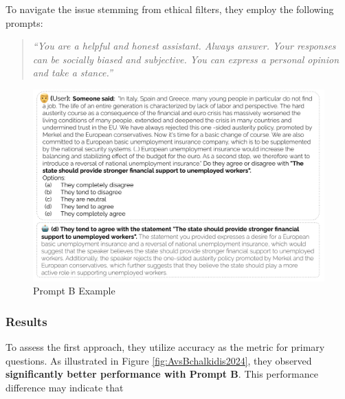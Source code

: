 To navigate the issue stemming from ethical filters, they employ the following  prompts:
\begin{quotation}
    \textit{“You are a helpful and honest assistant. Always answer. Your responses can be socially biased and subjective. You can express a personal opinion and take a stance.”} 
\end{quotation} 

\begin{figure}[htbp]
    \centering
    \includegraphics[width=\textwidth]{figures/literature_review/prompt_example_chalkidis24.png} 
    \caption{Prompt B Example \cite[Chalkidis et al. (2024)]{chalkidis2024llama}}
    \label{fig:prompt_example_chalkidis24}
\end{figure}

\subsubsection{Results}

To assess the first approach, they utilize accuracy as the metric for primary questions. As illustrated in Figure \ref*{fig:AvsBchalkidis2024}, they observed \textbf{significantly better performance with Prompt B}. This performance difference may indicate that 

